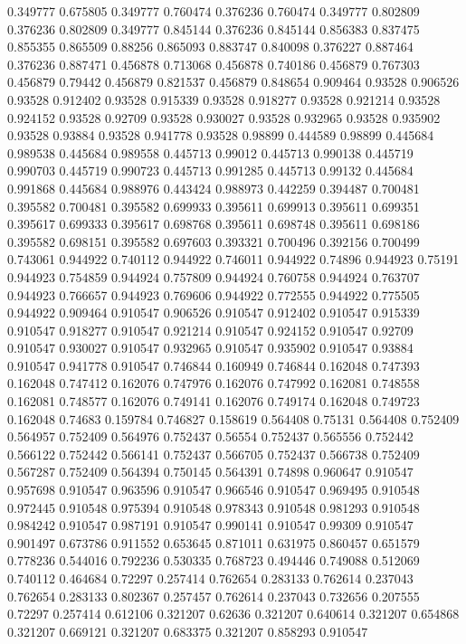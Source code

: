 0.349777 0.675805
0.349777 0.760474
0.376236 0.760474
0.349777 0.802809
0.376236 0.802809
0.349777 0.845144
0.376236 0.845144
0.856383 0.837475
0.855355 0.865509
0.88256 0.865093
0.883747 0.840098
0.376227 0.887464
0.376236 0.887471
0.456878 0.713068
0.456878 0.740186
0.456879 0.767303
0.456879 0.79442
0.456879 0.821537
0.456879 0.848654
0.909464 0.93528
0.906526 0.93528
0.912402 0.93528
0.915339 0.93528
0.918277 0.93528
0.921214 0.93528
0.924152 0.93528
0.92709 0.93528
0.930027 0.93528
0.932965 0.93528
0.935902 0.93528
0.93884 0.93528
0.941778 0.93528
0.98899 0.444589
0.98899 0.445684
0.989538 0.445684
0.989558 0.445713
0.99012 0.445713
0.990138 0.445719
0.990703 0.445719
0.990723 0.445713
0.991285 0.445713
0.99132 0.445684
0.991868 0.445684
0.988976 0.443424
0.988973 0.442259
0.394487 0.700481
0.395582 0.700481
0.395582 0.699933
0.395611 0.699913
0.395611 0.699351
0.395617 0.699333
0.395617 0.698768
0.395611 0.698748
0.395611 0.698186
0.395582 0.698151
0.395582 0.697603
0.393321 0.700496
0.392156 0.700499
0.743061 0.944922
0.740112 0.944922
0.746011 0.944922
0.74896 0.944923
0.75191 0.944923
0.754859 0.944924
0.757809 0.944924
0.760758 0.944924
0.763707 0.944923
0.766657 0.944923
0.769606 0.944922
0.772555 0.944922
0.775505 0.944922
0.909464 0.910547
0.906526 0.910547
0.912402 0.910547
0.915339 0.910547
0.918277 0.910547
0.921214 0.910547
0.924152 0.910547
0.92709 0.910547
0.930027 0.910547
0.932965 0.910547
0.935902 0.910547
0.93884 0.910547
0.941778 0.910547
0.746844 0.160949
0.746844 0.162048
0.747393 0.162048
0.747412 0.162076
0.747976 0.162076
0.747992 0.162081
0.748558 0.162081
0.748577 0.162076
0.749141 0.162076
0.749174 0.162048
0.749723 0.162048
0.74683 0.159784
0.746827 0.158619
0.564408 0.75131
0.564408 0.752409
0.564957 0.752409
0.564976 0.752437
0.56554 0.752437
0.565556 0.752442
0.566122 0.752442
0.566141 0.752437
0.566705 0.752437
0.566738 0.752409
0.567287 0.752409
0.564394 0.750145
0.564391 0.74898
0.960647 0.910547
0.957698 0.910547
0.963596 0.910547
0.966546 0.910547
0.969495 0.910548
0.972445 0.910548
0.975394 0.910548
0.978343 0.910548
0.981293 0.910548
0.984242 0.910547
0.987191 0.910547
0.990141 0.910547
0.99309 0.910547
0.901497 0.673786
0.911552 0.653645
0.871011 0.631975
0.860457 0.651579
0.778236 0.544016
0.792236 0.530335
0.768723 0.494446
0.749088 0.512069
0.740112 0.464684
0.72297 0.257414
0.762654 0.283133
0.762614 0.237043
0.762654 0.283133
0.802367 0.257457
0.762614 0.237043
0.732656 0.207555
0.72297 0.257414
0.612106 0.321207
0.62636 0.321207
0.640614 0.321207
0.654868 0.321207
0.669121 0.321207
0.683375 0.321207
0.858293 0.910547
